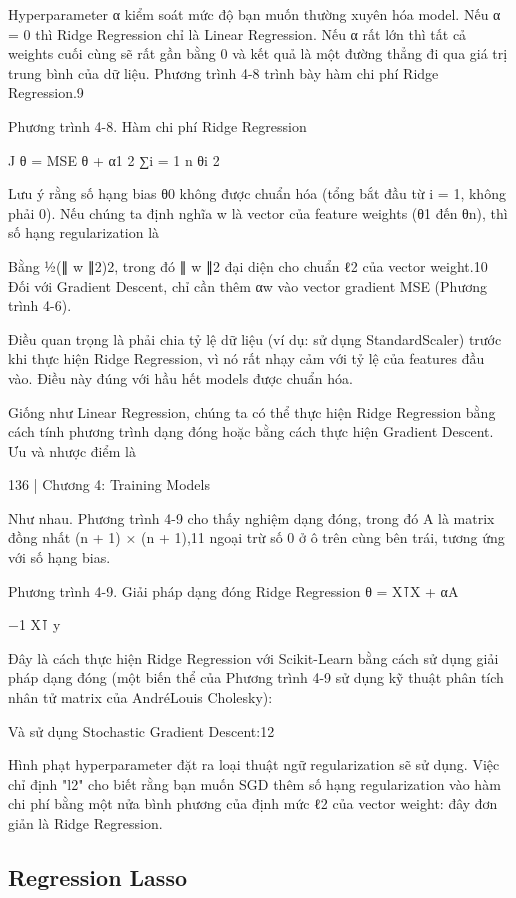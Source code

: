Hyperparameter α kiểm soát mức độ bạn muốn thường xuyên hóa model. Nếu α = 0 thì Ridge Regression chỉ là Linear Regression. Nếu α rất lớn thì tất cả weights cuối cùng sẽ rất gần bằng 0 và kết quả là một đường thẳng đi qua giá trị trung bình của dữ liệu. Phương trình 4-8 trình bày hàm chi phí Ridge Regression.9

Phương trình 4-8. Hàm chi phí Ridge Regression

J θ = MSE θ + α1 2 ∑i = 1 n θi 2

Lưu ý rằng số hạng bias θ0 không được chuẩn hóa (tổng bắt đầu từ i = 1, không phải 0). Nếu chúng ta định nghĩa w là vector của feature weights (θ1 đến θn), thì số hạng regularization là

Bằng ½(∥ w ∥2)2, trong đó ∥ w ∥2 đại diện cho chuẩn ℓ2 của vector weight.10 Đối với Gradient Descent, chỉ cần thêm αw vào vector gradient MSE (Phương trình 4-6).

Điều quan trọng là phải chia tỷ lệ dữ liệu (ví dụ: sử dụng StandardScaler) trước khi thực hiện Ridge Regression, vì nó rất nhạy cảm với tỷ lệ của features đầu vào. Điều này đúng với hầu hết models được chuẩn hóa.

Giống như Linear Regression, chúng ta có thể thực hiện Ridge Regression bằng cách tính phương trình dạng đóng hoặc bằng cách thực hiện Gradient Descent. Ưu và nhược điểm là

136 | Chương 4: Training Models

Như nhau. Phương trình 4-9 cho thấy nghiệm dạng đóng, trong đó A là matrix đồng nhất (n + 1) × (n + 1),11 ngoại trừ số 0 ở ô trên cùng bên trái, tương ứng với số hạng bias.

Phương trình 4-9. Giải pháp dạng đóng Ridge Regression θ = X⊺X + αA

−1 X⊺ y

Đây là cách thực hiện Ridge Regression với Scikit-Learn bằng cách sử dụng giải pháp dạng đóng (một biến thể của Phương trình 4-9 sử dụng kỹ thuật phân tích nhân tử matrix của AndréLouis Cholesky):

Và sử dụng Stochastic Gradient Descent:12

Hình phạt hyperparameter đặt ra loại thuật ngữ regularization sẽ sử dụng. Việc chỉ định "l2" cho biết rằng bạn muốn SGD thêm số hạng regularization vào hàm chi phí bằng một nửa bình phương của định mức ℓ2 của vector weight: đây đơn giản là Ridge Regression.

\subsection{Regression Lasso}

